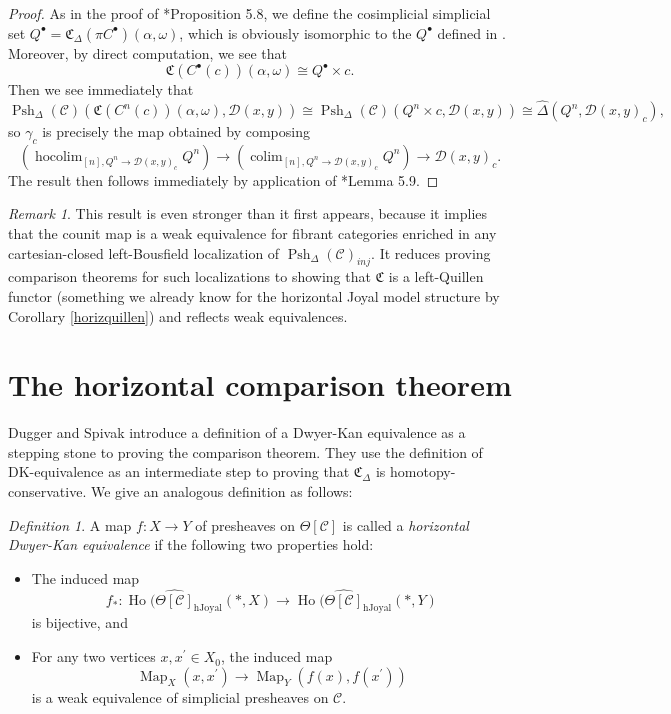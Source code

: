 \documentclass{amsart}
\numberwithin{equation}{section}
\theoremstyle{plain}   %
\theoremstyle{remark}
\newtheorem{rem}[subsection]{Remark}
\newtheorem{defn}[subsection]{Definition}
\theoremstyle{plain}
\DeclareMathOperator*{\coliml}{colim}
\DeclareMathOperator{\Psh}{Psh}
\DeclareMathOperator{\Map}{Map}
\DeclareMathOperator*{\hocoliml}{hocolim}
\newcommand{\psh}[1]{\ensuremath{\widehat{#1}}}
\newcommand{\C}{\ensuremath{\mathcal{C}}}
\newcommand{\cellset}{\ensuremath{\widehat{\Theta[\mathcal{C}]}}}
\begin{document}
\begin{proof}
	As in the proof of \cite{ds2}*{Proposition 5.8}, we define the cosimplicial simplicial set \(Q^\bullet = \mathfrak{C}_\Delta (\pi C^\bullet)(\alpha,\omega)\), which is obviously isomorphic to the \(Q^\bullet\) defined in \cite{ds2}. Moreover, by direct computation, we see that
	\[\mathfrak{C}(C^\bullet(c))(\alpha,\omega)\cong Q^\bullet \times c.\]
	Then we see immediately that
	\[\Psh_\Delta(\C)(\mathfrak{C}(C^n(c))(\alpha,\omega), \mathcal{D}(x,y)) \cong \Psh_\Delta(\C)(Q^n \times c, \mathcal{D}(x,y))\cong \psh{\Delta}(Q^n, \mathcal{D}(x,y)_c),\]
	so \(\gamma_c\) is precisely the map obtained by composing
	\[\left(\hocoliml_{[n],Q^n\to \mathcal{D}(x,y)_c} Q^n\right) \to \left(\coliml_{[n],Q^n\to \mathcal{D}(x,y)_c} Q^n\right) \to \mathcal{D}(x,y)_c.\]
	The result then follows immediately by application of \cite{ds2}*{Lemma 5.9}.
\end{proof}

\begin{rem}
	This result is even stronger than it first appears, because it implies that the counit map is a weak equivalence for fibrant categories enriched in any cartesian-closed left-Bousfield localization of \(\Psh_\Delta(\C)_{inj}\).  It reduces proving comparison theorems for such localizations to showing that \(\mathfrak{C}\) is a left-Quillen functor (something we already know for the horizontal Joyal model structure by Corollary \ref{horizquillen}) and reflects weak equivalences.
\end{rem}

\section{The horizontal comparison theorem}\label{horizcomparison}
Dugger and Spivak introduce a definition of a Dwyer-Kan equivalence as a stepping stone to proving the comparison theorem.  They use the definition of DK-equivalence as an intermediate step to proving that \(\mathfrak{C}_\Delta\) is homotopy-conservative.  We give an analogous definition as follows:

\begin{defn}
  A map \(f:X\to Y\) of presheaves on \(\Theta[\C]\) is called a \emph{horizontal Dwyer-Kan equivalence} if the following two properties hold:
	\begin{itemize}
		\item The induced map
		      \[f_*:\operatorname{Ho}(\cellset_{\mathrm{hJoyal}}(\ast,X) \to \operatorname{Ho}(\cellset_{\mathrm{hJoyal}}(\ast,Y)\]
		      is bijective, and
		\item For any two vertices \(x,x^\prime\in X_0\), the induced map
		      \[\Map_X(x,x^\prime) \to \Map_Y(f(x),f(x^\prime))\]
		      is a weak equivalence of simplicial presheaves on \(\C\).
	\end{itemize}
\end{defn}
\end{document}

